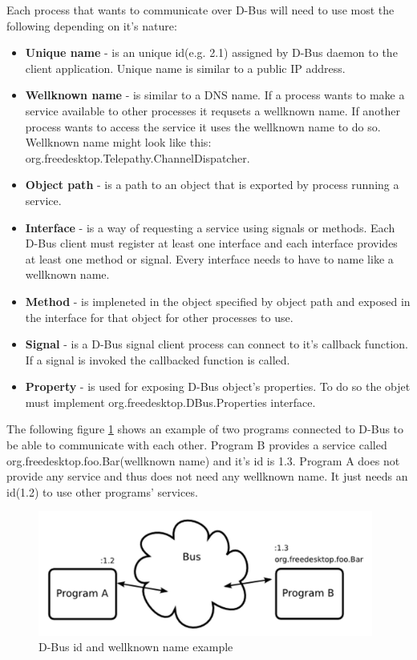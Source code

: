 Each process that wants to communicate over D-Bus will need to use most the following depending on it's nature: 
\begin{itemize}
	\item {\bf Unique name} - is an unique id(e.g. 2.1) assigned by D-Bus daemon to the client application. Unique name is similar to a public IP address.
	\item {\bf Wellknown name} - is similar to a DNS name. If a process wants to make a service available to other processes it requsets a wellknown name. If another process wants to access the service it uses the wellknown name to do so. Wellknown name might look like this: org.freedesktop.Telepathy.ChannelDispatcher.    
	\item {\bf Object path} - is a path to an object that is exported by process running a service.
	\item {\bf Interface} - is a way of requesting a service using signals or methods. Each D-Bus client must register at least one interface and each interface provides at least one method or signal. Every interface needs to have to name like a wellknown name.  
	\item {\bf Method} - is impleneted in the object specified by object path and exposed in the interface for that object for other processes to use. 
	\item {\bf Signal} - is a D-Bus signal client process can connect to it's callback function. If a signal is invoked the callbacked function is called.
	\item {\bf Property} - is used for exposing D-Bus object's properties. To do so the objet must implement org.freedesktop.DBus.Properties interface.
\end{itemize}

The following figure \ref{fig:dbusArchitectureNames} shows an example of two programs connected to D-Bus to be able to communicate with each other. Program B provides a service called org.freedesktop.foo.Bar(wellknown name) and it's id is 1.3. Program A does not provide any service and thus does not need any wellknown name. It just needs an id(1.2) to use other programs' services.\cite{dbusTP}

\begin{figure}[ht]
\begin{center}
	\includegraphics[width=11cm]{fig/dbus-architecture-names.png}
	\caption{D-Bus id and wellknown name example\cite{dbusTP}}
	\label{fig:dbusArchitectureNames}
\end{center}
\end{figure}



